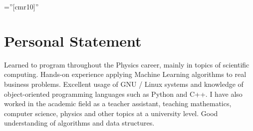 \documentclass[a4paper,10pt]{article} %
\begin{document}
\pagestyle{empty} %
\BgThispage
\font\fb=''[cmr10]'' %

\small




\par{\bigskip\par} %
\par{\bigskip\par}
\par{\bigskip\par}

\section{Personal Statement}
\bigskip
Learned to program throughout the Physics career, mainly in topics of scientific computing. Hands-on experience applying Machine Learning algorithms to real business problems. Excellent usage of GNU / Linux systems and knowledge of object-oriented programming languages such as Python and C++. I have also worked in the academic field as a teacher assistant, teaching mathematics, computer science, physics and other topics at a university level. Good understanding of algorithms and data structures.
\end{document}
